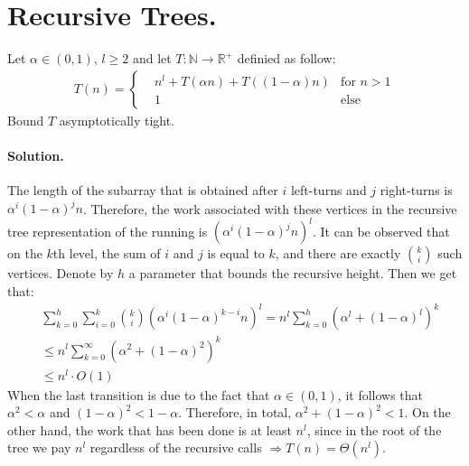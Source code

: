 \fi 


\section{Recursive Trees.}
Let $\alpha \in (0,1)$, $l\ge 2$ and let $T: \mathbb{N}\rightarrow\mathbb{R}^{+}$ definied as follow:
\begin{equation*}
  \begin{split}
    T\left(n\right)  = \left\{ \begin{array}{rcl}
        & n^{l} + T\left( \alpha n \right) + T\left( (1-\alpha) n \right)  & \mbox{for }  n > 1  \\
      & 1 & \mbox{else}  
  \end{array} \right. 
  \end{split}
\end{equation*}
Bound $T$ asymptotically tight. 
\ifdefined\SOLUTION
  \paragraph{Solution.}  The length of the subarray that is obtained after $i$ left-turns and $j$ right-turns is $\alpha^{i}(1-\alpha)^{j}n$. Therefore, the work associated with these vertices in the recursive tree representation of the running is $(\alpha^{i}(1-\alpha)^{j}n)^{l}$. It can be observed that on the $k$th level, the sum of $i$ and $j$ is equal to $k$, and there are exactly ${k \choose i}$ such vertices. Denote by $h$ a parameter that bounds the recursive height. Then we get that:
  \begin{equation*}
    \begin{split}
      & \sum_{k=0}^{h}{\sum_{i=0}^{k}{ { k \choose i  } \left( \alpha^{i}(1-\alpha)^{k-i} n \right)^{l}} } =  n^{l}\sum_{k=0}^{h}{ \left( \alpha^{l} + (1-\alpha)^{l} \right)^{k} } \\ 
        & \le n^{l}\sum_{k=0}^{\infty}{ \left( \alpha^{2} + (1-\alpha)^{2} \right)^{k} } \\ 
        & \le n^{l} \cdot O(1)
    \end{split}
  \end{equation*}
When the last transition is due to the fact that $\alpha \in (0,1)$, it follows that $\alpha^{2} < \alpha$ and $(1-\alpha)^{2} < 1 - \alpha$. Therefore, in total, $\alpha^{2} + (1-\alpha)^{2} < 1$. On the other hand, the work that has been done is at least $n^{l}$, since in the root of the tree we pay $n^{l}$ regardless of the recursive calls $\Rightarrow T(n) = \Theta(n^{l})$. 


